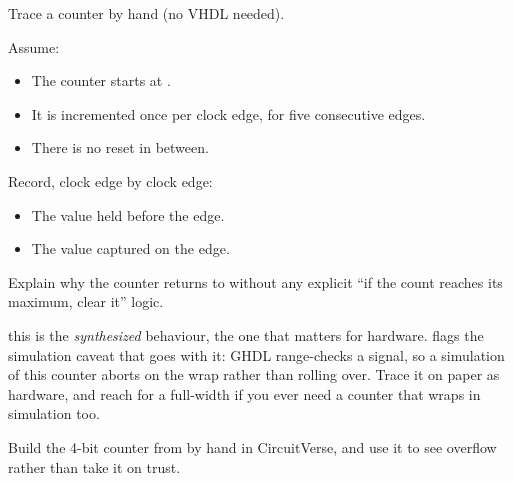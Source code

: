 \label{c6:ex:2}
Trace a  counter by hand (no VHDL needed).

Assume:
\begin{itemize}
  \item The counter starts at .
  \item It is incremented once per clock edge, for five consecutive edges.
  \item There is no reset in between.
\end{itemize}
Record, clock edge by clock edge:
\begin{itemize}
  \item The value held before the edge.
  \item The value captured on the edge.
\end{itemize}
Explain why the counter returns to  without any explicit ``if the count reaches its
maximum, clear it'' logic.

\note this is the \emph{synthesized} behaviour, the one that matters for hardware. 
flags the simulation caveat that goes with it: GHDL range-checks a 
signal, so a simulation of this counter aborts on the wrap rather than rolling over. Trace it on
paper as hardware, and reach for a full-width  if you ever need a counter that wraps
in simulation too.

\label{c6:ex:3}
Build the 4-bit counter from  by hand in CircuitVerse, and use it to see overflow
rather than take it on trust.

